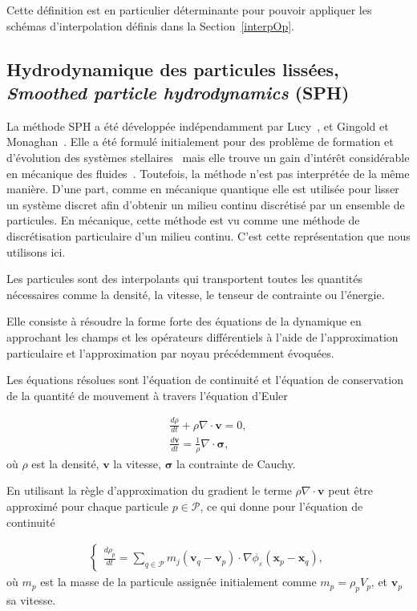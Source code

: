 Cette définition est en particulier déterminante pour pouvoir appliquer les schémas d'interpolation définis dans la Section~\ref{interpOp}.

\subsection{Hydrodynamique des particules lissées, \textit{Smoothed particle hydrodynamics} (SPH)}

La méthode SPH a été développée indépendamment par Lucy~\cite{lucy_1977}, et Gingold et Monaghan~\cite{gingold_monaghan_sph_1977}. Elle a été formulé initialement pour des problème de formation et d'évolution des systèmes stellaires~\cite{hultman1999hierarchical} mais elle trouve un gain d'intérêt considérable en mécanique des fluides~\cite{PhysRevE.52.4899, SHADLOO201611}. Toutefois, la méthode n'est pas interprétée de la même manière. D'une part, comme en mécanique quantique elle est utilisée pour lisser un système discret afin d'obtenir un milieu continu discrétisé par un ensemble de particules. En mécanique, cette méthode est vu comme une méthode de discrétisation particulaire d'un milieu continu. C'est cette représentation que nous utilisons ici.

Les particules sont des interpolants qui transportent toutes les quantités nécessaires comme la densité, la vitesse, le tenseur de contrainte ou l'énergie.

Elle consiste à résoudre la forme forte des équations de la dynamique en approchant les champs et les opérateurs différentiels à l'aide de l'approximation particulaire et l'approximation par noyau précédemment évoquées.

Les équations résolues sont l'équation de continuité et l'équation de conservation de la quantité de mouvement à travers l'équation d'Euler

\begin{eqnarray*}
    \frac{d\rho}{dt} + \rho \nabla \cdot \bm{v} = 0, \\
    \frac{d\bm v}{dt} = \frac1\rho \nabla \cdot \bm \sigma,
\end{eqnarray*}où $\rho$ est la densité, $\bm v$ la vitesse, $\bm \sigma$ la contrainte de Cauchy.

En utilisant la règle d'approximation du gradient le terme $\rho \nabla \cdot \bm{v}$ peut être approximé pour chaque particule $p \in \mathcal P$, ce qui donne pour l'équation de continuité

\begin{gather*}
    \left\{\begin{aligned}
        \frac{d\rho_p}{dt} = \sum_{q \in \mathcal P} m_j (\bm v_q - \bm v_p) \cdot \nabla \phi_\varepsilon(\bm x_p - \bm x_q),
    \end{aligned}  \right.
\end{gather*}où $m_p$ est la masse de la particule assignée initialement comme $m_p = \rho_p V_p$, et $\bm v_p$ sa vitesse.

